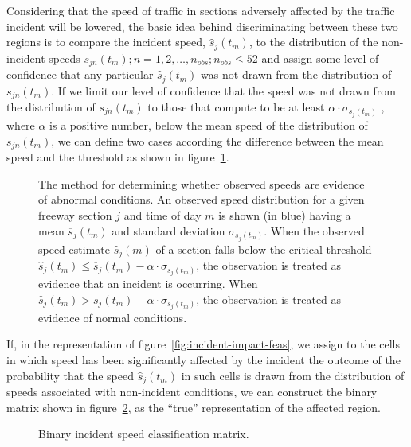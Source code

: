 \documentclass[12pt]{report}
\newcommand{\inputTikZ}[1]{%
  }
\newcommand{\inputTikZ}[1]{%
    \beginpgfgraphicnamed{#1-external}%
    \endpgfgraphicnamed%
  }
\begin{document}
Considering that the speed of traffic in sections adversely affected
by the traffic incident will be lowered, the basic idea behind
discriminating between these two regions is to compare the incident
speed, $\hat{s}_j(t_m)$, to the distribution of the non-incident
speeds $s_{jn}(t_m); n = 1,2,\ldots{},n_{obs}; n_{obs}\le 52$ and
assign some level of confidence that any particular $\hat{s}_j(t_m)$
was not drawn from the distribution of $s_{jn}(t_m)$. If we limit our
level of confidence that the speed was not drawn from the distribution
of $s_{jn}(t_m)$ to those that compute to be at least
$\alpha\cdot\sigma_{s_j(t_m)}$ , where $\alpha$ is a positive number,
below the mean speed of the distribution of $s_{jn}(t_m)$, we can
define two cases according the difference between the mean speed and
the threshold as shown in figure~\ref{fig:incident-speed-case}.
\begin{figure}[t]
  \begin{center}
    \inputTikZ{figs/incident-speed-classification}
    \caption[The method for determining whether observed speeds are
    evidence of abnormal conditions.]{The method for determining whether
      observed speeds are evidence of abnormal conditions.  An observed
      speed distribution for a given freeway section $j$ and time of day
      $m$ is shown (in blue) having a mean $\overline{s}_j(t_m)$ and
      standard deviation $\sigma_{s_j(t_m)}$.  When the observed speed
      estimate $\hat{s}_j(m)$ of a section falls below the critical
      threshold $\hat{s}_j(t_m) \le \overline{s}_j(t_m) -
      \alpha\cdot\sigma_{s_j(t_m)}$, the observation is treated as
      evidence that an incident is occurring.  When $\hat{s}_j(t_m) >
      \overline{s}_j(t_m) - \alpha\cdot\sigma_{s_j(t_m)}$, the
      observation is treated as evidence of normal conditions.}
    \label{fig:incident-speed-case}
  \end{center}
\end{figure}
If, in the representation of figure~\ref{fig:incident-impact-feas}, we
assign to the cells in which speed has been significantly affected by
the incident the outcome of the probability that the speed
$\hat{s}_j(t_m)$ in such cells is drawn from the distribution of speeds
associated with non-incident conditions, we can construct the binary
matrix shown in figure~\ref{fig:incident-speed-classification-binary},
as the ``true'' representation of the affected region.
\begin{figure}[t]
  \begin{center}
    \inputTikZ{figs/time-space-incident-schematic-binary}
    \caption[Binary incident speed classification matrix]{Binary incident speed classification matrix.}
    \label{fig:incident-speed-classification-binary}
  \end{center}
\end{figure}
\end{document}
